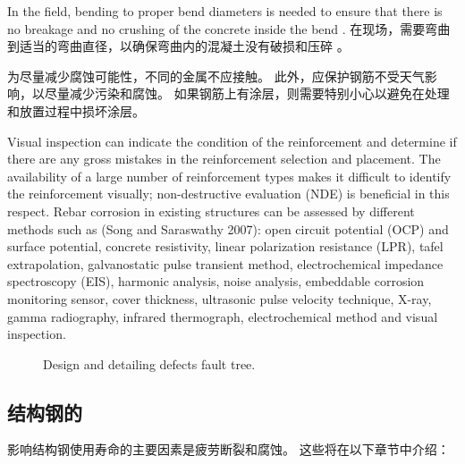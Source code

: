 In the field, bending to proper bend diameters is needed to ensure that there is no breakage and no crushing of the concrete inside the bend \cite{aci2011b}.
在现场，需要弯曲到适当的弯曲直径，以确保弯曲内的混凝土没有破损和压碎 \cite{aci2011b}。

为尽量减少腐蚀可能性，不同的金属不应接触。 此外，应保护钢筋不受天气影响，以尽量减少污染和腐蚀。 如果钢筋上有涂层，则需要特别小心以避免在处理和放置过程中损坏涂层。

Visual inspection can indicate the condition of the reinforcement and determine if there are any gross mistakes in the reinforcement selection and placement. The availability of a large number of reinforcement types makes it difficult to identify the reinforcement visually; non-destructive evaluation (NDE) is beneficial in this respect. Rebar corrosion in existing structures can be assessed by different methods such as (Song and Saraswathy 2007): open circuit potential (OCP) and surface potential, concrete resistivity, linear polarization resistance (LPR), tafel extrapolation, galvanostatic pulse transient method, electrochemical impedance spectroscopy (EIS), harmonic analysis, noise analysis, embeddable corrosion monitoring sensor, cover thickness, ultrasonic pulse velocity technique, X-ray, gamma radiography, infrared thermograph, electrochemical method and visual inspection.

\begin{figure}
  \caption{Design and detailing defects fault tree.}
  \label{fig:fault-tree-design-detailing}
\end{figure}

\subsection{结构钢的}
影响结构钢使用寿命的主要因素是疲劳断裂和腐蚀。 这些将在以下章节中介绍：

